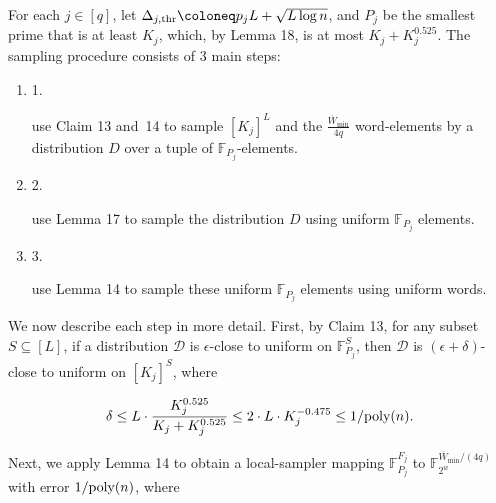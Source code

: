 


For each $j\in[q]$, let $\Delta_{j,{\rm thr}}\coloneq p_{j}L+\sqrt{L\log n}$, and $P_{j}$ be the smallest prime that is at least $K_{j}$, which, by Lemma 18, is at most $K_{j}+K_{j}^{0.525}$.
The sampling procedure consists of 3 main steps:\par


\begin{enumerate}


\item[] 
1. 


use Claim 13 and 14 to sample $[K_{j}]^{L}$ and the $\frac{\overline{W}_{\min}}{4q}$ word-elements by a distribution $D$ over a tuple of $\mathbb{F}_{P_{j}}$-elements.\par





\item[] 
2. 


use Lemma 17 to sample the distribution $D$ using uniform $\mathbb{F}_{P_{j}}$ elements.\par





\item[] 
3. 


use Lemma 14 to sample these uniform $\mathbb{F}_{P_{j}}$ elements using uniform words.\par





\end{enumerate}




We now describe each step in more detail.
First, by Claim 13, for any subset $S\subseteq[L]$, if a distribution $\mathcal{D}$ is $\epsilon$-close to uniform on $\mathbb{F}_{P_{j}}^{S}$, then $\mathcal{D}$ is $(\epsilon+\delta)$-close to uniform on $[K_{j}]^{S}$, where\par


\[\begin{gathered}
\displaystyle\delta\leq L\cdot\frac{K_{j}^{0.525}}{K_{j}+K_{j}^{0.525}}\leq 2\cdot L\cdot K_{j}^{-0.475}\leq 1/\textnormal{poly}(n).
\end{gathered}\]


Next, we apply Lemma 14 to obtain a local-sampler mapping $\mathbb{F}_{P_{j}}^{F_{j}}$ to $\mathbb{F}_{2^{w}}^{\overline{W}_{\min}/(4q)}$ with error $1/\textnormal{poly}(n)$, where\par


